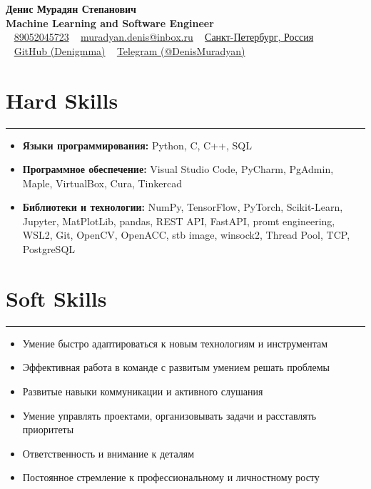 \documentclass[a4paper,14pt]{article}
\begin{document}
\begin{center}
    {\Huge \bfseries Денис Мурадян Степанович} \\
    \vspace{0.5em}
    {\Large \bfseries Machine Learning and Software Engineer} \\
    \vspace{1em}
    \faPhone~ \href{tel:89052045723}{89052045723} \hspace{1em}
    \faEnvelope~ \href{mailto:muradyan.denis@inbox.ru}{muradyan.denis@inbox.ru} \hspace{1em}
    \faHome~ \href{https://yandex.ru/maps/-/CHRjvNpm}{Санкт-Петербург, Россия} \\
    \vspace{0.5em}
    \faGithub~ \href{https://github.com/Denigmma}{GitHub (Denigmma)} \hspace{1em}
    \faTelegram~ \href{https://t.me/DenisMuradyan}{Telegram (@DenisMuradyan)}
\end{center}

\section*{Hard Skills}
\hrule
\vspace{0.5em}
\begin{itemize}
    \item \textbf{Языки программирования:} Python, C, C++, SQL
    \item \textbf{Программное обеспечение:} Visual Studio Code, PyCharm, PgAdmin, Maple, VirtualBox, Cura, Tinkercad
    \item \textbf{Библиотеки и технологии:} NumPy, TensorFlow, PyTorch, Scikit-Learn, Jupyter, MatPlotLib, pandas, REST API, FastAPI, promt engineering, WSL2, Git, OpenCV, OpenACC, stb image, winsock2, Thread Pool, TCP, PostgreSQL
\end{itemize}

\section*{Soft Skills}
\hrule
\vspace{0.5em}
\begin{itemize}
    \item Умение быстро адаптироваться к новым технологиям и инструментам
    \item Эффективная работа в команде с развитым умением решать проблемы
    \item Развитые навыки коммуникации и активного слушания
    \item Умение управлять проектами, организовывать задачи и расставлять приоритеты
    \item Ответственность и внимание к деталям
    \item Постоянное стремление к профессиональному и личностному росту
\end{itemize}
\end{document}
